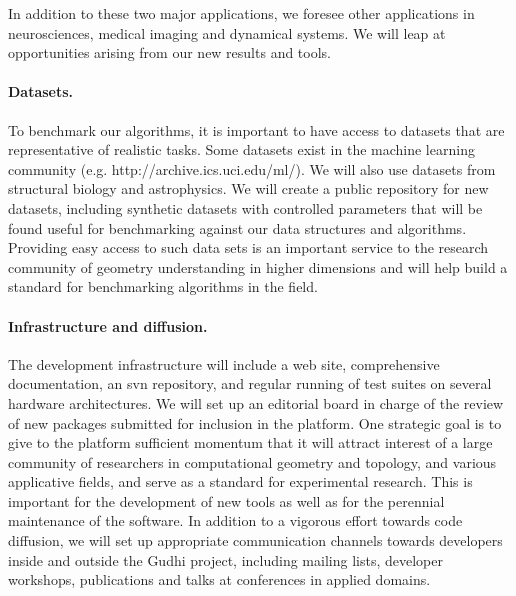 In addition to these two major applications, we foresee other
applications in neurosciences, medical imaging and dynamical
systems. We will leap at opportunities arising from our new results
and tools.




\paragraph{Datasets.}
To benchmark our algorithms, it is important to have access to datasets
that are representative of realistic tasks. Some datasets exist in the
machine learning community (e.g. http://archive.ics.uci.edu/ml/). We
will also use datasets from structural biology and astrophysics.  We
will create a public repository for new datasets, including synthetic
datasets with controlled parameters that will be found useful for
benchmarking against our data structures and algorithms. Providing easy
access to such data sets is an important service to the research
community of geometry understanding in higher dimensions and will help
build a standard for benchmarking algorithms in the field.


\paragraph{Infrastructure and diffusion.}
The development infrastructure will include a web site, 
comprehensive documentation, an svn repository, and regular running of
test suites on several hardware architectures.  We will set up an
editorial board in charge of the review of new packages
submitted for inclusion in the platform.  One strategic goal is to
give to the platform sufficient momentum that it will  attract
interest of a large community of researchers in computational geometry
and topology,
and various applicative fields, and serve as a standard for
experimental research. This is important for the development of new
tools as well as for the perennial maintenance of the software. In
addition to a vigorous effort towards code diffusion, we will set up
appropriate communication channels towards developers inside and
outside the Gudhi project, including mailing lists, developer
workshops, publications and talks at conferences in applied domains.















